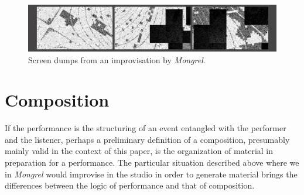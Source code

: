 \documentclass[11pt]{article}
\begin{document}
\begin{figure}
  \centering
  \includegraphics[width=\linewidth]{img/impro-2.jpeg}
  \caption{Screen dumps from an improvisation by \emph{Mongrel}.}
\end{figure}



\section*{Composition}
\label{sec:composition}

If the performance is the structuring of an event entangled with the
performer and the listener, perhaps a preliminary definition of a
composition, presumably mainly valid in the context of this paper, is the
organization of material in preparation for a performance. The
particular situation described above where we in \emph{Mongrel} would
improvise in the studio in order to generate material brings the
differences between the logic of performance and that of composition.
\end{document}
